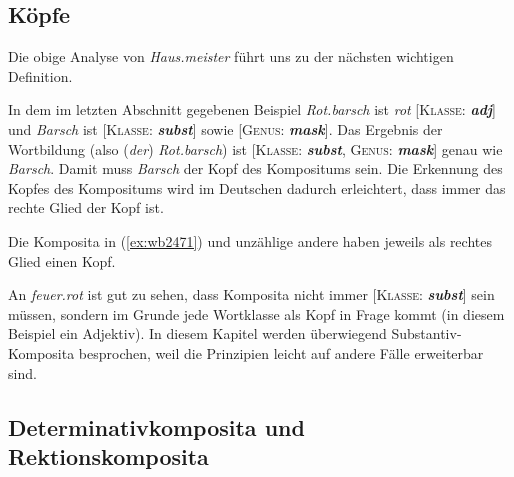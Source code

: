 \subsection{Köpfe}

\label{sec:wbkopf}

Die obige Analyse von \textit{Haus.meister} führt uns zu der nächsten wichtigen Definition.


In dem im letzten Abschnitt gegebenen Beispiel \textit{Rot.barsch} ist \textit{rot} [\textsc{Klasse}: \textit{\textbf{adj}}] und \textit{Barsch} ist [\textsc{Klasse}: \textit{\textbf{subst}}] sowie [\textsc{Genus}: \textit{\textbf{mask}}].
Das Ergebnis der Wortbildung (also (\textit{der}) \textit{Rot.barsch}) ist [\textsc{Klasse}: \textit{\textbf{subst}}, \textsc{Genus}: \textit{\textbf{mask}}] genau wie \textit{Barsch}.
Damit muss \textit{Barsch} der Kopf des Kompositums sein.
Die Erkennung des Kopfes des Kompositums wird im Deutschen dadurch erleichtert, dass immer das rechte Glied der Kopf ist.

Die Komposita in (\ref{ex:wb2471}) und unzählige andere haben jeweils als rechtes Glied einen Kopf.

\begin{exe}
  \ex\label{ex:wb2471}
  \begin{xlist}
  \end{xlist}
\end{exe}

An \textit{feuer.rot} ist gut zu sehen, dass Komposita nicht immer [\textsc{Klasse}: \textit{\textbf{subst}}] sein müssen, sondern im Grunde jede Wortklasse als Kopf in Frage kommt (in diesem Beispiel ein Adjektiv).
In diesem Kapitel werden überwiegend Substantiv-Komposita besprochen, weil die Prinzipien leicht auf andere Fälle erweiterbar sind.

\subsection{Determinativkomposita und Rektionskomposita}

\label{sec:detrekkomp}

